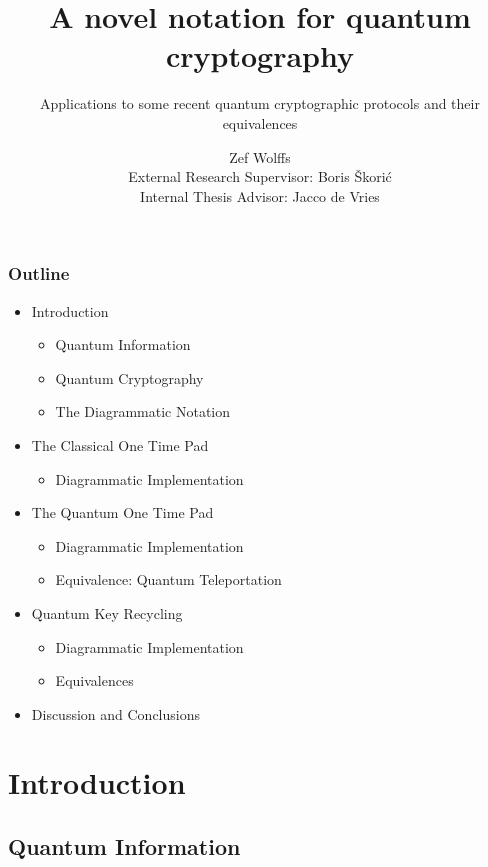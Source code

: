 \documentclass[]{beamer}
\title{A novel notation for quantum cryptography}
\subtitle{Applications to some recent quantum cryptographic protocols and their equivalences}
\author{Zef Wolffs \\ External Research Supervisor: Boris Škorić \\ Internal Thesis Advisor: Jacco de Vries }
\begin{document}
\maketitle

\begin{frame}
\frametitle{Outline}

\begin{itemize}

\item Introduction
	\begin{itemize}
		\item Quantum Information
		\item Quantum Cryptography
		\item The Diagrammatic Notation
	\end{itemize}

\item The Classical One Time Pad
	\begin{itemize}
		\item Diagrammatic Implementation
	\end{itemize}

\item The Quantum One Time Pad
	\begin{itemize}
		\item Diagrammatic Implementation
		\item Equivalence: Quantum Teleportation
	\end{itemize}

\item Quantum Key Recycling
	\begin{itemize}
		\item Diagrammatic Implementation
		\item Equivalences
	\end{itemize}

\item Discussion and Conclusions

\end{itemize}
\end{frame}

\section{Introduction}

\begin{frame}
	\centering 
	\Huge
\end{frame}

\subsection{Quantum Information}
\end{document}
